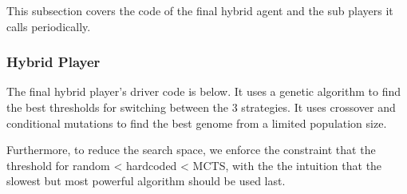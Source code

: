 This subsection covers the code of the final hybrid agent and the sub players it calls periodically.

\subsubsection{Hybrid Player}

The final hybrid player's driver code is below. It uses a genetic algorithm to find the best thresholds for switching between the 3 strategies. It uses crossover and conditional mutations to find the best genome from a limited population size.

Furthermore, to reduce the search space, we enforce the constraint that the threshold for random < hardcoded < MCTS, with the the intuition that the slowest but most powerful algorithm should be used last.


